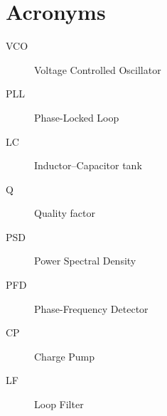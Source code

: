 \chapter*{Acronyms}
\begin{description}
  \item[VCO] Voltage Controlled Oscillator
  \item[PLL] Phase-Locked Loop
  \item[LC] Inductor–Capacitor tank
  \item[Q] Quality factor
  \item[PSD] Power Spectral Density
  \item[PFD] Phase-Frequency Detector
  \item[CP] Charge Pump
  \item[LF] Loop Filter
\end{description}


